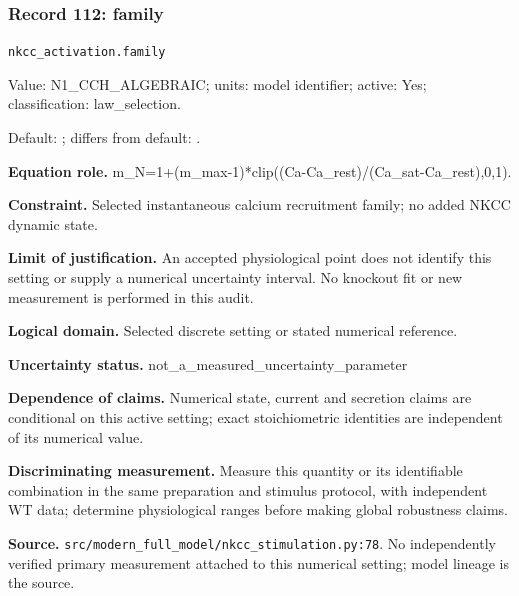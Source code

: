 \subsubsection*{Record 112: family}
{\small \nolinkurl{nkcc_activation.family}\par

Value: N1\_CCH\_ALGEBRAIC; units: model identifier; active: Yes; classification: law\_selection.\par

Default: ; differs from default: .\par

\textbf{Equation role.} m\_N=1+(m\_max-1)*clip((Ca-Ca\_rest)/(Ca\_sat-Ca\_rest),0,1).\par

\textbf{Constraint.} Selected instantaneous calcium recruitment family; no added NKCC dynamic state.\par

\textbf{Limit of justification.} An accepted physiological point does not identify this setting or supply a numerical uncertainty interval. No knockout fit or new measurement is performed in this audit.\par

\textbf{Logical domain.} Selected discrete setting or stated numerical reference.\par

\textbf{Uncertainty status.} not\_a\_measured\_uncertainty\_parameter\par

\textbf{Dependence of claims.} Numerical state, current and secretion claims are conditional on this active setting; exact stoichiometric identities are independent of its numerical value.\par

\textbf{Discriminating measurement.} Measure this quantity or its identifiable combination in the same preparation and stimulus protocol, with independent WT data; determine physiological ranges before making global robustness claims.\par

\textbf{Source.} \nolinkurl{src/modern_full_model/nkcc_stimulation.py:78}. No independently verified primary measurement attached to this numerical setting; model lineage is the source.\par}

